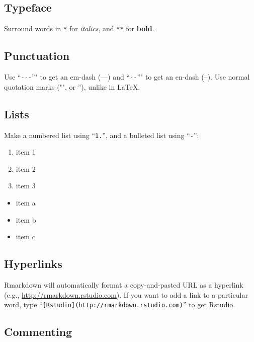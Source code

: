 \documentclass[11pt,]{article}
\providecommand{\tightlist}{%
  \setlength{\itemsep}{0pt}\setlength{\parskip}{0pt}}
\begin{document}
\hypertarget{typeface}{%
\subsection{Typeface}\label{typeface}}

Surround words in \texttt{*} for \emph{italics}, and \texttt{**} for
\textbf{bold}.

\hypertarget{punctuation}{%
\subsection{Punctuation}\label{punctuation}}

Use ``\texttt{-\/-\/-}''" to get an em-dash (---) and ``\texttt{-\/-}''"
to get an en-dash (--). Use normal quotation marks ("", or ''), unlike
in \LaTeX.

\hypertarget{lists}{%
\subsection{Lists}\label{lists}}

Make a numbered list using ``\texttt{1.}'', and a bulleted list using
``\texttt{-}'':

\begin{enumerate}
\def\labelenumi{\arabic{enumi}.}
\tightlist
\item
  item 1
\item
  item 2
\item
  item 3
\end{enumerate}

\begin{itemize}
\tightlist
\item
  item a
\item
  item b
\item
  item c
\end{itemize}

\hypertarget{hyperlinks}{%
\subsection{Hyperlinks}\label{hyperlinks}}

Rmarkdown will automatically format a copy-and-pasted URL as a hyperlink
(e.g., \url{http://rmarkdown.rstudio.com}). If you want to add a link to
a particular word, type
``\texttt{{[}Rstudio{]}(http://rmarkdown.rstudio.com)}'' to get
\href{http://rmarkdown.rstudio.com}{Rstudio}.

\hypertarget{commenting}{%
\subsection{Commenting}\label{commenting}}
\end{document}
